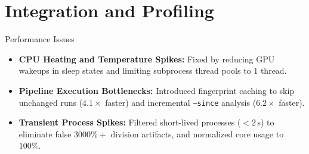 \section{Integration and Profiling}

\begin{frame}{Performance Issues}
    \begin{itemize}
        \setlength{\itemsep}{8pt}
        \item \textbf{CPU Heating and Temperature Spikes:} Fixed by reducing GPU wakeups in sleep states and limiting subprocess thread pools to 1 thread.
        \item \textbf{Pipeline Execution Bottlenecks:} Introduced fingerprint caching to skip unchanged runs ($4.1\times$ faster) and incremental \texttt{--since} analysis ($6.2\times$ faster).
        \item \textbf{Transient Process Spikes:} Filtered short-lived processes ($<2$\,s) to eliminate false $3000\%+$ division artifacts, and normalized core usage to $100\%$.
    \end{itemize}
\end{frame}
